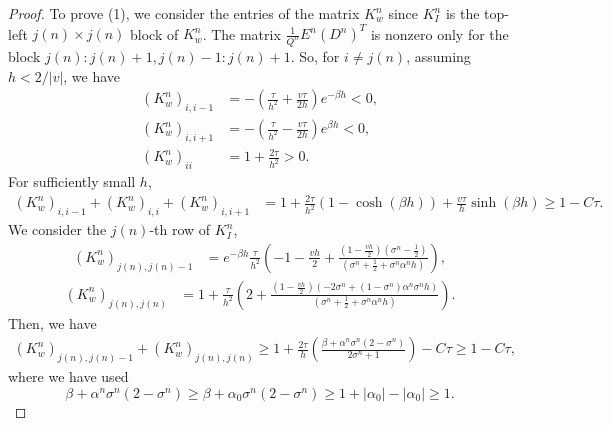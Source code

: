 \documentclass[11pt,reqno]{amsart}
\theoremstyle{plain}
\theoremstyle{definition}
\numberwithin{equation}{section}
\newcommand{\paren}[1]{\left(#1\right)}
\newcommand{\abs}[1]{\left\lvert #1 \right\rvert}
\begin{document}
\begin{proof}
To prove (1), we consider the entries of the matrix $K_w^n$ since $K_I^n$ is the top-left $j(n)\times j(n)$ block of $K_w^n$.
The matrix $\frac{1}{Q^n}E^n(D^n)^T$ is nonzero only for the block $j(n):j(n)+1, j(n)-1:j(n)+1$.
So, for $i \neq j(n)$, assuming $h < 2 / \abs{v}$, we have
\begin{align}
    (K_w^n)_{i,i-1} &= -\paren{\frac{\tau}{h^2} + \frac{v \tau}{2 h} } e^{-\beta h} < 0, \\
    (K_w^n)_{i,i+1} &= -\paren{\frac{\tau}{h^2} - \frac{v \tau}{2 h} } e^{\beta h} < 0, \\
    (K_w^n)_{ii} &= 1 + \frac{2\tau}{h^2} > 0.
\end{align}
For sufficiently small $h$,
\begin{equation}
\begin{aligned}
    (K_w^n)_{i,i-1} + (K_w^n)_{i,i} + (K_w^n)_{i,i+1}
    &= 1 + \frac{2\tau}{h^2} \paren{1 - \cosh(\beta h)} + \frac{v \tau}{h} \sinh(\beta h)  \ge 1 - C \tau.
\end{aligned}
\end{equation}
We consider the $j(n)$-th row of $K_I^n$,
\begin{equation}
\begin{aligned}
    (K_w^n)_{j(n),j(n)-1} &= e^{-\beta h}\frac{\tau}{h^2}\paren{ -1 - \frac{vh}{2} + \frac{\paren{1-\frac{vh}{2}} \paren{\sigma^n-\frac{1}{2}} }{\paren{\sigma^n+\frac{1}{2}+\sigma^n\alpha^nh} } },
\end{aligned}
\end{equation}
\begin{equation}
\begin{aligned}
    (K_w^n)_{j(n),j(n)} &=  1 + \frac{\tau}{h^2}\paren{2 + \frac{\paren{1-\frac{vh}{2}} \paren{-2\sigma^n+\paren{1-\sigma^n}\alpha^n\sigma^nh} }{\paren{\sigma^n+\frac{1}{2}+\sigma^n\alpha^nh} }}.
\end{aligned}
\end{equation}
Then, we have
\begin{equation}
\begin{aligned}
    (K_w^n)_{j(n),j(n)-1} + (K_w^n)_{j(n),j(n)}  \ge 1 + \frac{2\tau}{h} \paren{  \frac{\beta + \alpha^n\sigma^n(2-\sigma^n)}{2\sigma^n+1} }- C\tau\ge 1 - C\tau,
\end{aligned}
\end{equation}
where we have used
\begin{equation}
    \beta + \alpha^n\sigma^n(2-\sigma^n) \ge \beta + \alpha_0\sigma^n(2-\sigma^n) \ge 1 +\abs{\alpha_0} - \abs{\alpha_0}  \ge 1.

\end{equation}
\end{proof}
\end{document}

